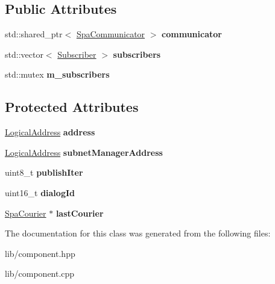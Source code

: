 \subsection*{Public Attributes}
\begin{DoxyCompactItemize}
\item 
\mbox{\label{classComponent_ab124decba1547f96b7df055e3b7e902e}} 
std\+::shared\+\_\+ptr$<$ \hyperlink{classSpaCommunicator}{Spa\+Communicator} $>$ {\bfseries communicator}
\item 
\mbox{\label{classComponent_a4b1fc3511ba706058d5e575e5b4b55f7}} 
std\+::vector$<$ \hyperlink{structSubscriber}{Subscriber} $>$ {\bfseries subscribers}
\item 
\mbox{\label{classComponent_ad289c568dee48290561f885d69f09d94}} 
std\+::mutex {\bfseries m\+\_\+subscribers}
\end{DoxyCompactItemize}
\subsection*{Protected Attributes}
\begin{DoxyCompactItemize}
\item 
\mbox{\label{classComponent_aa60ef4220c2630dde612e2f0164b3676}} 
\hyperlink{structLogicalAddress}{Logical\+Address} {\bfseries address}
\item 
\mbox{\label{classComponent_a8147bae546da489c3ffa5a1a634739a0}} 
\hyperlink{structLogicalAddress}{Logical\+Address} {\bfseries subnet\+Manager\+Address}
\item 
\mbox{\label{classComponent_a5dff98c7893ff79b6ff35cdc26f65240}} 
uint8\+\_\+t {\bfseries publish\+Iter}
\item 
\mbox{\label{classComponent_a6d22415eb4e07f9cc5a5c917972bf0dd}} 
uint16\+\_\+t {\bfseries dialog\+Id}
\item 
\mbox{\label{classComponent_ab8aa5882c1e2c8139e3ec9d9d27ff174}} 
\hyperlink{structSpaCourier}{Spa\+Courier} $\ast$ {\bfseries last\+Courier}
\end{DoxyCompactItemize}


The documentation for this class was generated from the following files\+:\begin{DoxyCompactItemize}
\item 
lib/component.\+hpp\item 
lib/component.\+cpp\end{DoxyCompactItemize}
